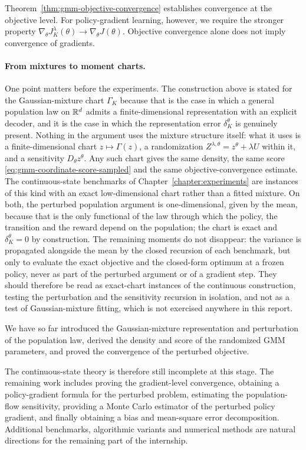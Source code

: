 Theorem~\ref{thm:gmm-objective-convergence} establishes convergence at the objective level. For policy-gradient learning, however, we require the stronger property $\nabla_\theta J_K^\lambda(\theta) \longrightarrow \nabla_\theta J(\theta)$. Objective convergence alone does not imply convergence of gradients. 

\paragraph{From mixtures to moment charts.}
One point matters before the experiments. The construction above is stated for the Gaussian-mixture chart $\Gamma_K$ because that is the case in which a general population law on $\mathbb{R}^d$ admits a finite-dimensional representation with an explicit decoder, and it is the case in which the representation error $\delta_K^\theta$ is genuinely present. Nothing in the argument uses the mixture structure itself: what it uses is a finite-dimensional chart $z\mapsto\Gamma(z)$, a randomization $Z^{\lambda,\theta}=z^\theta+\lambda U$ within it, and a sensitivity $D_\theta z^\theta$. Any such chart gives the same density, the same score \eqref{eq:gmm-coordinate-score-sampled} and the same objective-convergence estimate. The continuous-state benchmarks of Chapter~\ref{chapter:experiments} are instances of this kind with an exact low-dimensional chart rather than a fitted mixture. On both, the perturbed population argument is one-dimensional, given by the mean, because that is the only functional of the law through which the policy, the transition and the reward depend on the population; the chart is exact and $\delta_K^\theta=0$ by construction. The remaining moments do not disappear: the variance is propagated alongside the mean by the closed recursion of each benchmark, but only to evaluate the exact objective and the closed-form optimum at a frozen policy, never as part of the perturbed argument or of a gradient step. They should therefore be read as exact-chart instances of the continuous construction, testing the perturbation and the sensitivity recursion in isolation, and not as a test of Gaussian-mixture fitting, which is not exercised anywhere in this report.

We have so far introduced the Gaussian-mixture representation and perturbation of the population law, derived the density and score of the randomized GMM parameters, and proved the convergence of the perturbed objective.

The continuous-state theory is therefore still incomplete at this stage. The remaining work includes proving the gradient-level convergence, obtaining a policy-gradient formula for the perturbed problem, estimating the population-flow sensitivity, providing a Monte Carlo estimator of the perturbed policy gradient, and finally obtaining a bias and mean-square error decomposition. Additional benchmarks, algorithmic variants and numerical methods are natural directions for the remaining part of the internship.
